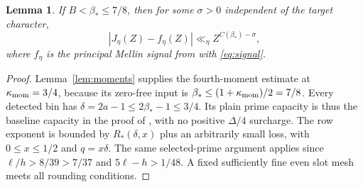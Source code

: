 \documentclass[11pt]{article}
\newtheorem{lemma}[theorem]{Lemma}
\begin{document}
\begin{lemma}\label{lem:high}
If $B<\beta_*\le7/8$, then for
some $\sigma>0$ independent of the
target character,
\[
       |J_\eta(Z)-f_\eta(Z)|
          \ll_\eta Z^{C(\beta_*)-\sigma},
\]
where $f_\eta$ is the principal Mellin signal from \cite{OAI} with
\eqref{eq:signal}.
\end{lemma}

\begin{proof}
Lemma~\ref{lem:moments} supplies the fourth-moment estimate at
$\kappa_{\rm mom}=3/4$, because its
zero-free input is $\beta_*\le(1+\kappa_{\rm mom})/2=7/8$. Every detected bin has
$\delta=2a-1\le2\beta_*-1\le3/4$. Its plain prime capacity is thus
the baseline capacity in the proof of \cite[Part II, capacity
comparison]{OAI}, with no positive $\Delta/4$ surcharge.
The row exponent is bounded by $R_*(\delta,x)$ plus an arbitrarily small
loss, with $0\le x\le1/2$ and $q=x\delta$. The same selected-prime
argument applies since $\ell/h>8/39>7/37$ and
$5\ell-h>1/48$. A fixed sufficiently fine even slot mesh meets all
rounding conditions.


\end{proof}
\end{document}
